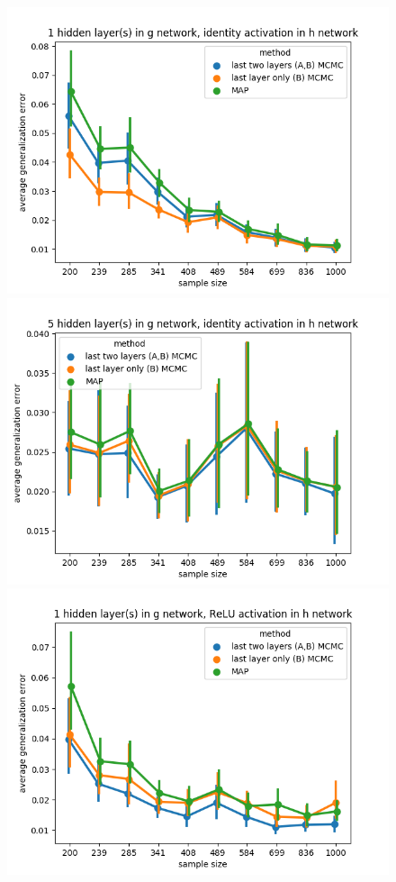 \documentclass{article} %
\begin{document}
\begin{figure}[h]
	\begin{center}
		\includegraphics[scale=0.4]{taskid0.png}
		\includegraphics[scale=0.4]{taskid1.png}
		\includegraphics[scale=0.4]{taskid2.png}

\end{center}
\end{figure}
\end{document}
